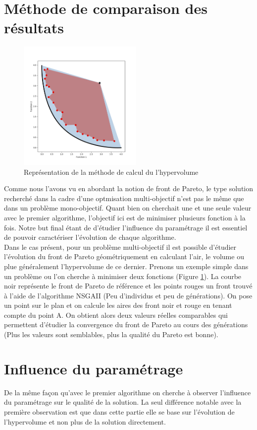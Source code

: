 \documentclass[12pt]{report}
\begin{document}
    \section{Méthode de comparaison des résultats}
      \begin{figure}
        \centering
        \includegraphics[width=6cm]{img/hypervolume.png}
        \caption{Représentation de la méthode de calcul du l'hypervolume}
        \label{hypervolume}
      \end{figure}
      Comme nous l'avons vu en abordant la notion de front de Pareto, le type solution recherché dans la cadre d'une optmisation multi-objectif n'est pas le même que dans un problème mono-objectif. Quant bien on cherchait une et une seule valeur avec le premier algorithme, l'objectif ici est de minimiser plusieurs fonction à la fois. Notre but final étant de d'étudier l'influence du paramétrage il est essentiel de pouvoir caractériser l'évolution de chaque algorithme. \\
      Dans le cas présent, pour un problème multi-objectif il est possible d'étudier l'évolution du front de Pareto géométriquement en calculant l'air, le volume ou plue généralement l'hypervolume de ce dernier.
      Prenons un exemple simple dans un problème ou l'on cherche à minimiser deux fonctions (Figure \ref{hypervolume}). La courbe noir représente le front de Pareto de référence et les points rouges un front trouvé à l'aide de l'algorithme NSGAII (Peu d'individus et peu de générations). On pose un point sur le plan et on calcule les aires des front noir et rouge en tenant compte du point A. On obtient alors deux valeurs réelles comparables qui permettent d'étudier la convergence du front de Pareto au cours des générations (Plus les valeurs sont semblables, plus la qualité du Pareto est bonne).
    \section{Influence du paramétrage}
      De la même façon qu'avec le premier algorithme on cherche à observer l'influence du paramétrage sur le qualité de la solution. La seul différence notable avec la première observation est que dans cette partie elle se base sur l'évolution de l'hypervolume et non plus de la solution directement.
\end{document}
